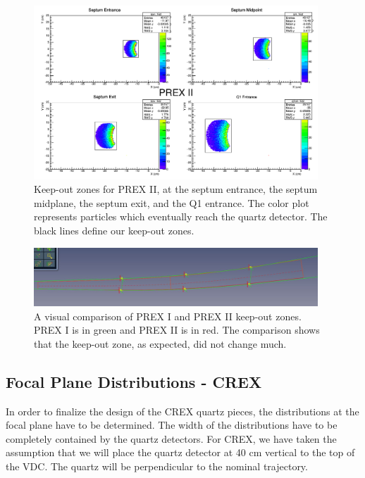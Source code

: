 \documentclass[11pt]{amsart}
\begin{document}
\FloatBarrier

\begin{figure}
\includegraphics[width=0.95\textwidth]{plots/keepout.png}
\caption{Keep-out zones for PREX II, at the septum entrance, the septum midplane, the septum exit, and the Q1 entrance. The color plot represents particles which eventually reach the quartz detector. The black lines define our keep-out zones.}
\end{figure}

\begin{figure}
\includegraphics[width=0.95\textwidth]{plots/PREXvsPREXII.JPG}
\caption{A visual comparison of PREX I and PREX II keep-out zones. PREX I is in green and PREX II is in red. The comparison shows that the keep-out zone, as expected, did not change much.}
\end{figure}

\FloatBarrier

\subsection{ Focal Plane Distributions - CREX}

In order to finalize the design of the CREX quartz pieces, the distributions at the focal plane have to be determined. The width of the distributions have to be completely contained by the quartz detectors. For CREX, we have taken the assumption that we will place the quartz detector at 40 cm vertical to the top of the VDC. The quartz will be perpendicular to the nominal trajectory. 
\end{document}
